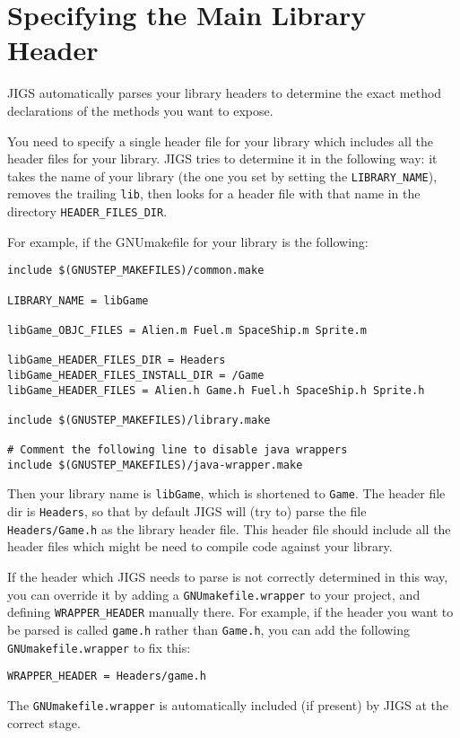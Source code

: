 \section{Specifying the Main Library Header}
JIGS automatically parses your library headers to determine the exact
method declarations of the methods you want to expose.  

You need to specify a single header file for your library which
includes all the header files for your library.  JIGS tries to
determine it in the following way: it takes the name of your library 
(the one you set by setting the \texttt{LIBRARY\_NAME}), removes 
the trailing \texttt{lib}, then looks for a header file with that name 
in the directory \texttt{HEADER\_FILES\_DIR}. 

For example, if the GNUmakefile for your library is the following:

\begin{verbatim}
include $(GNUSTEP_MAKEFILES)/common.make

LIBRARY_NAME = libGame

libGame_OBJC_FILES = Alien.m Fuel.m SpaceShip.m Sprite.m

libGame_HEADER_FILES_DIR = Headers
libGame_HEADER_FILES_INSTALL_DIR = /Game
libGame_HEADER_FILES = Alien.h Game.h Fuel.h SpaceShip.h Sprite.h

include $(GNUSTEP_MAKEFILES)/library.make

# Comment the following line to disable java wrappers
include $(GNUSTEP_MAKEFILES)/java-wrapper.make
\end{verbatim}

Then your library name is \texttt{libGame}, which is shortened to
\texttt{Game}.  The header file dir is \texttt{Headers}, so that 
by default JIGS will (try to) parse the file \texttt{Headers/Game.h}
as the library header file.  This header file should include all the
header files which might be need to compile code against your library.

If the header which JIGS needs to parse is not correctly determined in
this way, you can override it by adding a \texttt{GNUmakefile.wrapper}
to your project, and defining \texttt{WRAPPER\_HEADER} manually there.
For example, if the header you want to be parsed is called
\texttt{game.h} rather than \texttt{Game.h}, you can add the following 
\texttt{GNUmakefile.wrapper} to fix this: 
\begin{verbatim}
WRAPPER_HEADER = Headers/game.h
\end{verbatim}
The \texttt{GNUmakefile.wrapper} is automatically included (if present) 
by JIGS at the correct stage.

